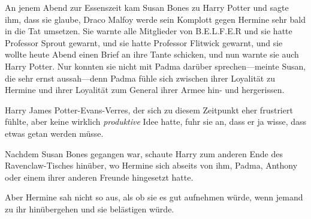 \later

An jenem Abend zur Essenszeit kam Susan Bones zu Harry Potter und sagte ihm, dass sie glaube, Draco Malfoy werde sein Komplott gegen Hermine sehr bald in die Tat umsetzen. Sie warnte alle Mitglieder von B.E.L.F.E.R und sie hatte Professor Sprout gewarnt, und sie hatte Professor Flitwick gewarnt, und sie wollte heute Abend einen Brief an ihre Tante schicken, und nun warnte sie auch Harry Potter. Nur konnten sie nicht mit Padma darüber sprechen—meinte Susan, die sehr ernst aussah—denn Padma fühle sich zwischen ihrer Loyalität zu Hermine und ihrer Loyalität zum General ihrer Armee hin- und hergerissen.

Harry James Potter-Evans-Verres, der sich zu diesem Zeitpunkt eher frustriert fühlte, aber keine wirklich \emph{produktive} Idee hatte, fuhr sie an, dass er ja wisse, dass etwas getan werden müsse.

Nachdem Susan Bones gegangen war, schaute Harry zum anderen Ende des Ravenclaw-Tisches hinüber, wo Hermine sich abseits von ihm, Padma, Anthony oder einem ihrer anderen Freunde hingesetzt hatte.

Aber Hermine sah nicht so aus, als ob sie es gut aufnehmen würde, wenn jemand zu ihr hinübergehen und sie belästigen würde.

